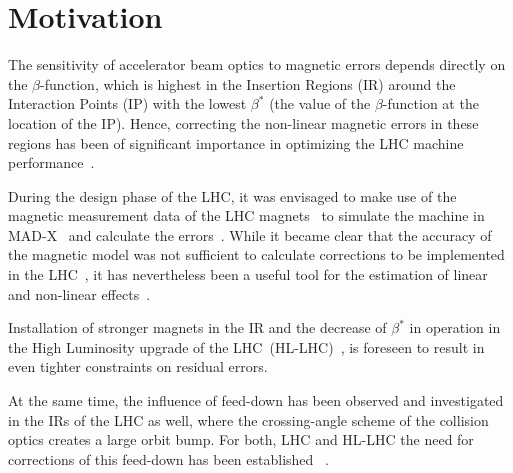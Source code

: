 \section{Motivation}


The sensitivity of accelerator beam optics to magnetic errors depends directly on the $\beta$-function, which 
is highest in the Insertion Regions (IR) around the Interaction Points (IP) 
with the lowest $\beta^*$ (the value of the $\beta$-function at the location of the IP).
Hence, correcting the non-linear magnetic errors in these regions
has been of significant importance in optimizing the LHC machine 
performance~\cite{MacleanCommissioningNonlinearOptics2016,MacleanNewMethodsMeasurement2017,MacleanNewLHCOptics2017,
MacleanDetailedReviewLHC2019,MacleanNewApproachLHC2019,MacleanProspectsBeambasedStudy2022}.

During the design phase of the LHC, it was envisaged to make use of 
the magnetic measurement data of the LHC 
magnets~\cite{SammutMathematicalFormulationPredict2006,SammutMathematicalFormulationPredict2007,SammutMathematicalFormulationPredict2009} to
simulate the machine in MAD-X~\cite{DeniauMADXUserGuide} and calculate the errors~\cite{BruningDynamicApertureStudies2004}.
While it became clear that the accuracy of the magnetic model was not sufficient to
calculate corrections to be implemented in the LHC~\cite{MacleanFirstMeasurementCorrection2015},
it has nevertheless been a useful tool for the estimation of linear and non-linear 
effects~\cite{MacleanNewApproachLHC2019,MacleanFirstMeasurementCorrection2015,
TomasCERNLargeHadron2010,PerssonChromaticCouplingCorrection2013,
DillyAmplitudeDetuningMisaligned2020}.

Installation of stronger magnets in the IR and the decrease of $\beta^*$ in operation in the High Luminosity upgrade of the 
LHC~(HL-LHC)~\cite{FartoukhHLLHCAcceleratorPhysics2015,BejarAlonsoHighLuminosityLargeHadron2020},
is foreseen to result in even tighter constraints on residual errors. 


At the same time, the influence of feed-down has been observed and investigated in the IRs 
of the LHC as well, where the crossing-angle scheme of the collision optics creates a large orbit bump.
For both, LHC and HL-LHC the need for corrections of this feed-down has been established
~\cite{MacleanNewMethodsMeasurement2017,
MacleanDetailedReviewLHC2019, 
MacleanNewApproachLHC2019,
MacleanProspectsBeambasedStudy2022,
MacleanFirstMeasurementCorrection2015,
MacleanNonlinearOpticsCommissioning2016,
MacleanLHCMD21712018, 
BuffatOpticsMeasurementCorrection2022}.

